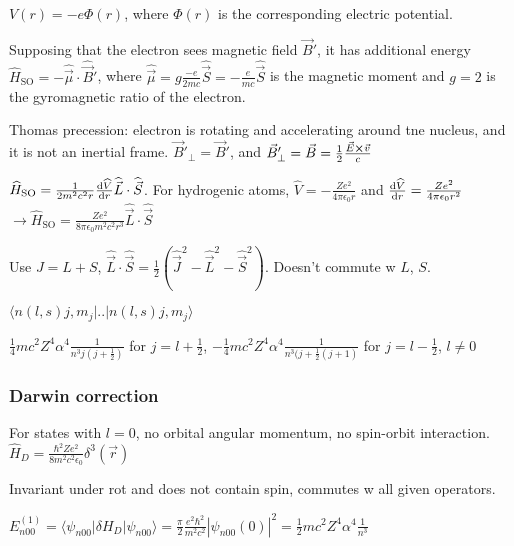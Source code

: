 $V(r) = -e \Phi(r)$, where $\Phi(r)$ is the corresponding electric potential.

Supposing that the electron sees magnetic field $\vec{B}'$, it has additional energy $\widehat{H}_{\textrm{SO}} = - \widehat{\vec{\mu}} \cdot \widehat{\vec{B}}'$, where $\widehat{\vec{\mu}} = g \frac{-e}{2mc} \widehat{\vec{S}} = - \frac{e}{mc} \widehat{\vec{S}}$ is the magnetic moment and $g=2$ is the gyromagnetic ratio of the electron.

Thomas precession: electron is rotating and accelerating around tne nucleus, and it is not an inertial frame. $\vec{B}'_{\perp} = \vec{B}'$, and $\vec{B}'_{\perp} = \vec{B} = \frac{1}{2} \frac{\vec{E} \cross \vec{v}}{c}$

$\widehat{H}_{\textrm{SO}} = \frac{1}{2m^2c^2 r} \dv{\widehat{V}}{r} \widehat{\vec{L}} \cdot \widehat{\vec{S}}$. For hydrogenic atoms, $\widehat{V} = -\frac{Ze^2}{4 \pi \epsilon_0 r}$ and $\dv{\widehat{V}}{r} = \frac{Ze^2}{4 \pi \epsilon_0 r^2}$
$\rightarrow \widehat{H}_{\textrm{SO}} = \frac{Ze^2}{8 \pi \epsilon_0 m^2 c^2 r^3} \widehat{\vec{L}} \cdot \widehat{\vec{S}}$

Use $J=L+S$, $\widehat{\vec{L}} \cdot \widehat{\vec{S}} = \frac{1}{2} (\widehat{\vec{J}}^2 - \widehat{\vec{L}}^2 - \widehat{\vec{S}}^2)$. Doesn't commute w $L$, $S$.

$\langle n(l,s)j,m_j|..|n(l,s)j, m_j\rangle$

$\frac{1}{4} mc^2 Z^4 \alpha^4 \frac{1}{n^3 j(j+\frac{1}{2})}$ for $j=l+\frac{1}{2}$, $-\frac{1}{4} mc^2 Z^4 \alpha^4 \frac{1}{n^3 (j+\frac{1}{2}(j+1)}$ for $j=l - \frac{1}{2}$, $l\neq 0$

\subsubsection{Darwin correction}

For states with $l=0$, no orbital angular momentum, no spin-orbit interaction.
$\widehat{H}_D = \frac{\hbar^2 Z e^2}{8 m^2 c^2 \epsilon_0} \delta^3 (\vec{r})$

Invariant under rot and does not contain spin, commutes w all given operators.

$E_{n00}^{(1)} = \langle \psi_{n00} | \delta H_D | \psi_{n00} \rangle = \frac{\pi}{2} \frac{e^2 \hbar^2}{m^2 c^2} |\psi_{n00}(0)|^2 = \frac{1}{2} mc^2 Z^4 \alpha^4 \frac{1}{n^3}$

